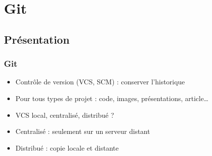 \documentclass[english, french]{beamer}
\begin{document}
\section{Git}
\subsection{Présentation}
\begin{frame}
	\frametitle{Git}
	\begin{itemize}
		\item Contrôle de version (VCS, SCM) : conserver l’historique
		\item Pour tous types de projet : code, images, présentations, article…
		\item VCS local, centralisé, distribué ? \pause
		\item Centralisé : seulement sur un serveur distant
		\item Distribué : copie locale et distante
	\end{itemize}
\end{frame}
\end{document}
